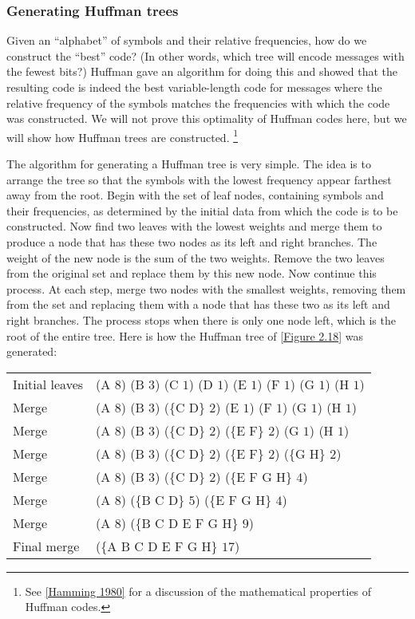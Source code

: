 \subsubsection*{Generating Huffman trees}

Given an “alphabet” of symbols and their relative frequencies, how do we construct the “best” code?
(In other words, which tree will encode messages with the fewest bits?)
Huffman gave an algorithm for doing this and showed that the resulting code is indeed the best variable-length code for messages where the relative frequency of the symbols matches the frequencies with which the code was constructed.
We will not prove this optimality of Huffman codes here, but we will show how Huffman trees are constructed.%
\footnote{
	See \cref{Hamming 1980} for a discussion of the mathematical properties of Huffman codes.
}

The algorithm for generating a Huffman tree is very simple.
The idea is to arrange the tree so that the symbols with the lowest frequency appear farthest away from the root.
Begin with the set of leaf nodes, containing symbols and their frequencies, as determined by the initial data from which the code is to be constructed.
Now find two leaves with the lowest weights and merge them to produce a node that has these two nodes as its left and right branches.
The weight of the new node is the sum of the two weights.
Remove the two leaves from the original set and replace them by this new node.
Now continue this process.
At each step, merge two nodes with the smallest weights, removing them from the set and replacing them with a node that has these two as its left and right branches.
The process stops when there is only one node left, which is the root of the entire tree.
Here is how the Huffman tree of \cref{Figure 2.18} was generated:
\begin{center}
	\begin{tabular}{ll}
		Initial leaves & (A \( 8 \)) (B \( 3 \)) (C \( 1 \)) (D \( 1 \)) (E \( 1 \)) (F \( 1 \)) (G \( 1 \)) (H \( 1 \))  \\
		Merge          & (A \( 8 \)) (B \( 3 \)) (\{C D\} \( 2 \)) (E \( 1 \)) (F \( 1 \)) (G \( 1 \)) (H \( 1 \))        \\
		Merge          & (A \( 8 \)) (B \( 3 \)) (\{C D\} \( 2 \)) (\{E F\} \( 2 \)) (G \( 1 \)) (H \( 1 \))              \\
		Merge          & (A \( 8 \)) (B \( 3 \)) (\{C D\} \( 2 \)) (\{E F\} \( 2 \)) (\{G H\} \( 2 \))                    \\
		Merge          & (A \( 8 \)) (B \( 3 \)) (\{C D\} \( 2 \)) (\{E F G H\} \( 4 \))                                  \\
		Merge          & (A \( 8 \)) (\{B C D\} \( 5 \)) (\{E F G H\} \( 4 \))                                            \\
		Merge          & (A \( 8 \)) (\{B C D E F G H\} \( 9 \))                                                          \\
		Final merge    & (\{A B C D E F G H\} \( 17 \))
	\end{tabular}
\end{center}

